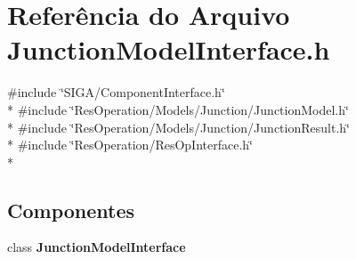 \section{Referência do Arquivo Junction\+Model\+Interface.\+h}
\label{_junction_model_interface_8h}
{\ttfamily \#include \char`\"{}S\+I\+G\+A/\+Component\+Interface.\+h\char`\"{}}\\*
{\ttfamily \#include \char`\"{}Res\+Operation/\+Models/\+Junction/\+Junction\+Model.\+h\char`\"{}}\\*
{\ttfamily \#include \char`\"{}Res\+Operation/\+Models/\+Junction/\+Junction\+Result.\+h\char`\"{}}\\*
{\ttfamily \#include \char`\"{}Res\+Operation/\+Res\+Op\+Interface.\+h\char`\"{}}\\*
\subsection*{Componentes}
\begin{DoxyCompactItemize}
\item 
class {\bf Junction\+Model\+Interface}
\end{DoxyCompactItemize}
